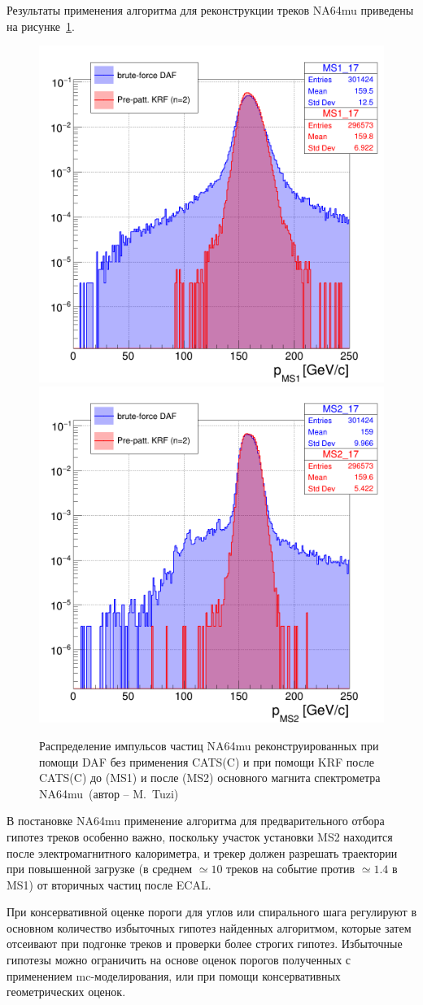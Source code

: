 Результаты применения алгоритма для реконструкции треков NA64mu приведены на
рисунке~\ref{fig:cats-impact-na64}.
\begin{figure}[ht]
    \centering
    \includegraphics[width=0.49\linewidth]{images//illustrative/catsc-impact.png}
    \includegraphics[width=0.49\linewidth]{images//illustrative/catsc-impact-2.png}
    \caption{Распределение импульсов частиц NA64mu реконструированных при
    помощи DAF без применения CATS(C) и при помощи KRF после CATS(C)
    до (MS1) и после (MS2) основного магнита спектрометра NA64mu~(автор -- M.~Tuzi)}
    \label{fig:cats-impact-na64}
\end{figure}
В постановке NA64mu применение алгоритма для предварительного отбора гипотез треков
особенно важно, поскольку участок установки MS2 находится после электромагнитного
калориметра, и трекер должен разрешать траектории при повышенной
загрузке (в среднем $\simeq 10$ треков на событие против $\simeq 1.4$ в MS1)
от вторичных частиц после ECAL.

При консервативной оценке пороги для углов или спирального шага
регулируют в основном количество избыточных гипотез найденных алгоритмом, которые
затем отсеивают при подгонке треков и проверки более строгих гипотез. Избыточные
гипотезы можно ограничить на основе оценок порогов полученных с
применением \acrshort{mc}-моделирования, или при помощи консервативных
геометрических оценок.

